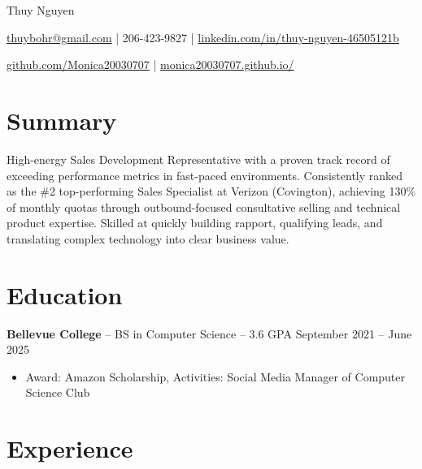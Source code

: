 \documentclass[11pt]{article}       %
\begin{document}
\centerline{\Huge Thuy Nguyen}

\vspace{5pt}

\centerline{\href{mailto:thuybohr@gmail.com}{thuybohr@gmail.com} | 206-423-9827 |
\href{https://www.linkedin.com/in/thuy-nguyen-46505121b/}{linkedin.com/in/thuy-nguyen-46505121b}}

\centerline{\href{https://github.com/Monica20030707}{github.com/Monica20030707} | 
\href{https://monica20030707.github.io/}{monica20030707.github.io/}} 

\vspace{-9pt}

\section*{Summary}
High-energy Sales Development Representative with a proven track record of exceeding performance metrics in fast-paced environments. Consistently ranked as the \#2 top-performing Sales Specialist at Verizon (Covington), achieving 130\% of monthly quotas through outbound-focused consultative selling and technical product expertise. Skilled at quickly building rapport, qualifying leads, and translating complex technology into clear business value.

\vspace{-10pt}

\section*{Education}
\textbf{Bellevue College} -- BS in Computer Science -- 3.6 GPA \hfill September 2021 -- June 2025\\
\vspace{-9pt}
\begin{itemize}
  \item Award: Amazon Scholarship, Activities: Social Media Manager of Computer Science Club
\end{itemize}

\vspace{-18.5pt}

\section*{Experience}
\end{document}

